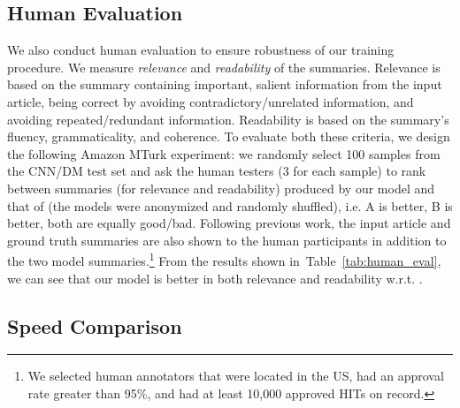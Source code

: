 \documentclass[11pt,a4paper]{article}
\def\tabref#1{Table~\ref{#1}}
\begin{document}
\subsection{Human Evaluation}
\label{sec:human_eval}
We also conduct human evaluation to ensure robustness of our training procedure.
We measure \emph{relevance} and \emph{readability} of the summaries.
Relevance is based on the summary containing important, salient information from the input article, being correct by avoiding contradictory/unrelated information, and avoiding repeated/redundant information. Readability is based on the summary’s fluency, grammaticality, and coherence.
To evaluate both these criteria, we design the following Amazon MTurk experiment: we randomly select 100 samples from the CNN/DM test set and ask the human testers (3 for each sample)
to rank between summaries (for relevance and readability) produced by our model and that of \citet{get_to_the_point}
(the models were anonymized and randomly shuffled), i.e. A is better, B is better, both are equally good/bad.
Following previous work, the input article and ground truth summaries are also shown to the human participants in addition to the two model summaries.\footnote{We selected human annotators that were located in the US, had
an approval rate greater than 95\%, and had at least 10,000 approved HITs on record.}
From the results shown in~\tabref{tab:human_eval}, we can see that our model is better in both relevance and readability w.r.t. \citet{get_to_the_point}.



\begin{table}[t]
\centering
{}
\vspace{-12pt}
\caption{
Speed comparison with \protect{}.
}
\vspace{-12pt}
\label{tab:speed}
\end{table}

\subsection{Speed Comparison}
\end{document}
